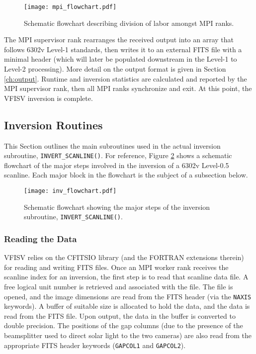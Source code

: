 \documentclass[11pt]{article}
\begin{document}
\begin{figure}[!ht]
\centering
\texttt{[image: mpi\_flowchart.pdf]}
\caption{Schematic flowchart describing division of labor amongst MPI ranks.}
\label{fig:mpi_flow}
\end{figure}

The MPI supervisor rank rearranges the received output into an array that follows \solisvsm 6302v
Level-1 standards, then writes it to an external FITS file with a minimal header (which will later
be populated downstream in the Level-1 to Level-2 processing).  More detail on the output format is
given in Section \ref{ch:output}.  Runtime and inversion statistics are calculated and reported by
the MPI supervisor rank, then all MPI ranks synchronize and exit.  At this point, the VFISV inversion
is complete.

\subsection{Inversion Routines}\label{s:invert}
This Section outlines the main subroutines used in the actual inversion subroutine,
\texttt{INVERT\_SCANLINE()}.  For reference, Figure \ref{fig:inv_flow} shows a schematic
flowchart of the major steps involved in the inversion of a \solisvsm 6302v Level-0.5 scanline.
Each major block in the flowchart is the subject of a subsection below.

\begin{figure}
\centering
\texttt{[image: inv\_flowchart.pdf]}
\caption{Schematic flowchart showing the major steps of the inversion subroutine, \texttt{INVERT\_SCANLINE()}.}
\label{fig:inv_flow}
\end{figure}


\subsubsection{Reading the Data}\label{ss:data}
VFISV relies on the CFITSIO library (and the FORTRAN extensions therein) for reading and writing FITS files.
Once an MPI worker rank receives the scanline index for an inversion, the first step is to read that
scanline data file.  A free logical unit number is retrieved and associated with the file.
The file is opened, and the image dimensions are read from the FITS header (via the \texttt{NAXIS}
keywords).  A buffer of suitable size is allocated to hold the data, and the data is read
from the FITS file.  Upon output, the data in the buffer is converted to double precision.
The positions of the gap columns (due to the presence of the beamsplitter used to direct
solar light to the two \solisvsm cameras) are also read from the appropriate FITS header 
keywords (\texttt{GAPCOL1} and \texttt{GAPCOL2}).
\end{document}
